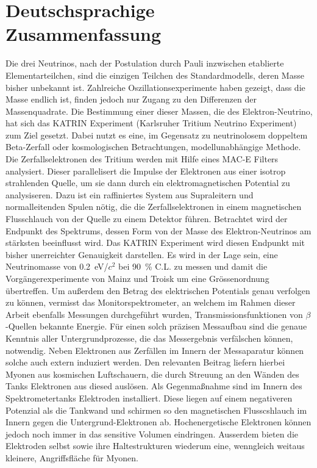 \chapter*{Deutschsprachige Zusammenfassung}

Die drei Neutrinos, nach der Postulation durch Pauli inzwischen etablierte Elementarteilchen, sind die einzigen Teilchen des Standardmodells, deren Masse bisher unbekannt ist. Zahlreiche Oszillationsexperimente haben gezeigt, dass die Masse endlich ist, finden jedoch nur Zugang zu den Differenzen der Massenquadrate. Die Bestimmung einer dieser Massen, die des Elektron-Neutrino, hat sich das KATRIN Experiment ({Ka}rlsruher {Tri}tium {N}eutrino Experiment) zum Ziel gesetzt. Dabei nutzt es eine, im Gegensatz zu neutrinolosem doppeltem Beta-Zerfall oder kosmologischen Betrachtungen, modellunabh\"angige Methode. Die Zerfallselektronen des Tritium werden mit Hilfe eines MAC-E Filters analysiert. Dieser parallelisert die Impulse der Elektronen aus einer isotrop strahlenden Quelle, um sie dann durch ein elektromagnetischen Potential zu analysiseren. Dazu ist ein raffiniertes System aus Supraleitern und normalleitenden Spulen n\"otig, die die Zerfallselektronen in einem magnetischen Flusschlauch von der Quelle zu einem Detektor f\"uhren. Betrachtet wird der Endpunkt des Spektrums, dessen Form von der Masse des Elektron-Neutrinos am st\"arksten beeinflusst wird. Das KATRIN Experiment wird diesen Endpunkt mit bisher unerreichter Genauigkeit darstellen. Es wird in der Lage sein, eine Neutrinomasse von \SI{0.2}{\electronvolt}/$c^2$ bei \SI{90}{\percent} C.L. zu messen und damit die Vorg\"angerexperimente von Mainz und Troisk um eine Gr\"ossenordnung \"ubertreffen. Um au\ss erdem den Betrag des elektrischen Potentials genau verfolgen zu k\"onnen, vermisst das Monitorspektrometer, an welchem im Rahmen dieser Arbeit ebenfalls Messungen durchgef\"uhrt wurden, Transmissionsfunktionen von $\beta$-Quellen bekannte Energie. 
F\"ur einen solch pr\"azisen Messaufbau sind die genaue Kenntnis aller Untergrundprozesse, die das Messergebnis verf\"alschen k\"onnen, notwendig. Neben Elektronen aus Zerf\"allen im Innern der Messaparatur k\"onnen solche auch extern induziert werden. Den relevanten Beitrag liefern hierbei Myonen aus kosmischen Luftschauern, die durch Streuung an den W\"anden des Tanks Elektronen aus diesed ausl\"osen. Als Gegenma\ss nahme sind im Innern des Spektrometertanks Elektroden installiert. Diese liegen auf einem negativeren Potenzial als die Tankwand und schirmen so den magnetischen Flusscshlauch im Innern gegen die Untergrund-Elektronen ab. Hochenergetische Elektronen k\"onnen jedoch noch immer in das sensitive Volumen eindringen. Ausserdem bieten die Elektroden selbst sowie ihre Haltestrukturen wiederum eine, wenngleich weitaus kleinere, Angriffsfl\"ache f\"ur Myonen.\\

